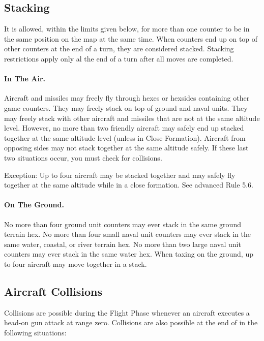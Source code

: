 \subsection{Stacking}

It is allowed, within the limits given below, for more than one counter to be in the same position on the map at the same time. When counters end up on top of other counters at the end of a turn, they are considered stacked. Stacking restrictions apply only al the end of a turn after all moves are completed.

\paragraph{In The Air.} Aircraft and missiles may freely fly through hexes or hexsides containing other game counters. They may freely stack on top of ground and naval units. They may freely stack with other aircraft and missiles that are not at the same altitude level. However, no more than two friendly aircraft may safely end up stacked together at the same altitude level (unless in Close Formation). Aircraft from opposing sides may not stack together at the same altitude safely. If these last two situations occur, you must check for collisions.

Exception: Up to four aircraft may be stacked together and may safely fly together at the same altitude while in a close formation. See advanced Rule 5.6.

\paragraph{On The Ground.} No more than four ground unit counters may ever stack in the same ground terrain hex. No more than four small naval unit counters may ever stack in the same water, coastal, or river terrain hex. No more than two large naval unit counters may ever stack in the same water hex. When taxing on the ground, up to four aircraft may move together in a stack.

\subsection{Aircraft Collisions}

Collisions are possible during the Flight Phase whenever an aircraft executes a head-on gun attack at range zero. Collisions are also possible at the end of  in the following situations:

